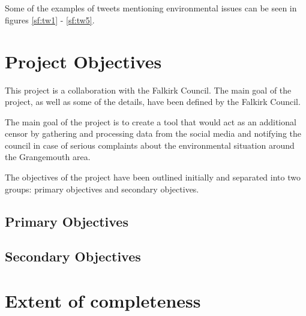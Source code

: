 \begin{figure}[t!]
\begin{minipage}{10cm}
 \end{minipage}
 \\ \vspace{0.1cm}
 \begin{minipage}{10cm}
     \centering
 \end{minipage}
 \\ \vspace{0.1cm}
 \begin{minipage}{10cm}
     \centering
 \end{minipage}
 \label{fig:multifigtweets}
 \end{figure}
 
 Some of the examples of tweets mentioning environmental issues can be seen in figures \ref{sf:tw1} - \ref{sf:tw5}.

\section{Project Objectives}
\label{sec:objectives}

This project is a collaboration with the Falkirk Council. The main goal of the project, as well as some of the details, have been defined by the Falkirk Council.

The main goal of the project is to create a tool that would act as an additional censor by gathering and processing data from the social media and notifying the council in case of serious complaints about the environmental situation around the Grangemouth area. 

The objectives of the project have been outlined initially and separated into two groups: primary objectives and secondary objectives.

\subsection{Primary Objectives}
\label{sec:primary}

\subsection{Secondary Objectives}
\label{sec:secondary}


\section{Extent of completeness}
\label{sec:completeness}
